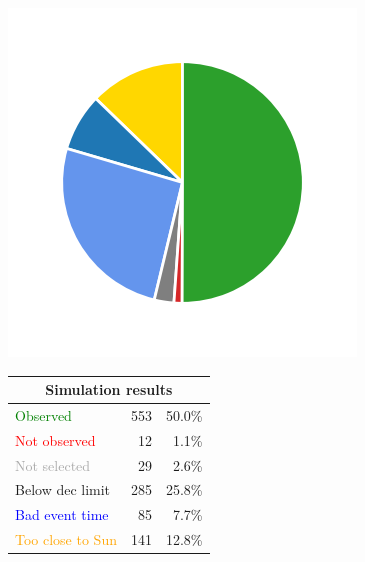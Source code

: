 \begin{colsection}
\begin{colsection}
\begin{figure}[p]
    \begin{center}
        \begin{minipage}[t]{0.2\textwidth}\vspace{10pt}
            \includegraphics[width=\linewidth]{images/gw_sims/1n8_pie.png}
        \end{minipage}
        \begin{minipage}[t]{0.37\textwidth}\vspace{0pt}
            \begin{tabular}{lrr}
                \multicolumn{3}{c}{\textbf{Simulation results}} \\
                \midrule
                \textcolor{Green}{Observed} & 553 & 50.0\% \\
                \textcolor{Red}{Not observed} & 12 & 1.1\% \\
                \textcolor{darkgray}{Not selected} & 29 & 2.6\% \\
                \textcolor{NavyBlue}{Below dec limit} & 285 & 25.8\% \\
                \textcolor{Blue}{Bad event time} & 85 & 7.7\% \\
                \textcolor{Orange}{Too close to Sun} & 141 & 12.8\% \\

\end{tabular}
\end{minipage}
\end{center}
\end{figure}
\end{colsection}
\end{colsection}

